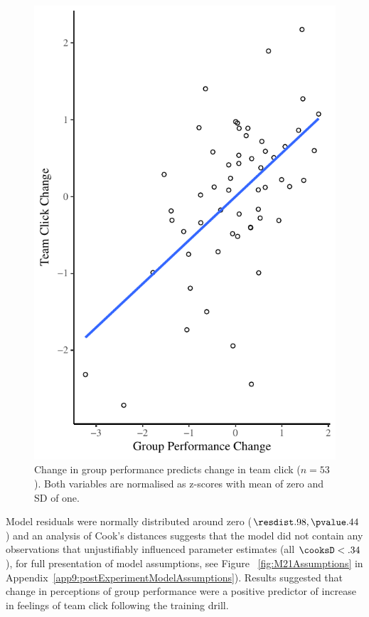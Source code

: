 
 \begin{figure}
     \centering
     \includegraphics[width=0.5\linewidth,keepaspectratio] {images/groupPerfClickChangeCondition}
     \caption{Change in group performance predicts change in team click ($n = 53$).  Both variables are normalised as z-scores with mean of zero and SD of one.}
     \label{fig:groupPerfClickChangeCondition}
 \end{figure}

Model residuals were normally distributed around zero ($\resdist .98, \pvalue .44$) and an analysis of Cook's distances suggests that the model did not contain any observations that unjustifiably influenced parameter estimates (all $\cooksD < .34$), for full presentation of model assumptions, see Figure ~\ref{fig:M21Assumptions} in Appendix~\ref{app9:postExperimentModelAssumptions}). Results suggested that change in perceptions of group performance were a positive predictor of increase in feelings of team click following the training drill.

